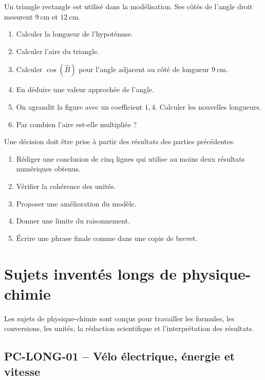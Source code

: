 \documentclass[11pt,a4paper]{article}
\newcounter{exercice}
\begin{document}
\begin{exercice}
Un triangle rectangle est utilisé dans la modélisation. Ses côtés de l'angle droit mesurent $9\ \mathrm{cm}$ et $12\ \mathrm{cm}$.
\begin{enumerate}
  \item Calculer la longueur de l'hypoténuse.
  \item Calculer l'aire du triangle.
  \item Calculer $\cos(\widehat{B})$ pour l'angle adjacent au côté de longueur $9\ \mathrm{cm}$.
  \item En déduire une valeur approchée de l'angle.
  \item On agrandit la figure avec un coefficient $1{,}4$. Calculer les nouvelles longueurs.
  \item Par combien l'aire est-elle multipliée ?
\end{enumerate}
\end{exercice}

\begin{exercice}
Une décision doit être prise à partir des résultats des parties précédentes.
\begin{enumerate}
  \item Rédiger une conclusion de cinq lignes qui utilise au moins deux résultats numériques obtenus.
  \item Vérifier la cohérence des unités.
  \item Proposer une amélioration du modèle.
  \item Donner une limite du raisonnement.
  \item Écrire une phrase finale comme dans une copie de brevet.
\end{enumerate}
\end{exercice}
\newpage
\section{Sujets inventés longs de physique-chimie}

\begin{attention}
Les sujets de physique-chimie sont conçus pour travailler les formules, les conversions, les unités, la rédaction scientifique et l'interprétation des résultats.
\end{attention}
\subsection{PC-LONG-01 -- Vélo électrique, énergie et vitesse}
\end{document}
